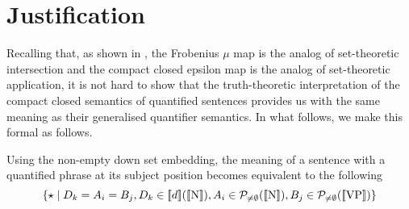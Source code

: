 \section{Justification}
\label{just}



Recalling that, as shown in \cite{CoeckePaquettePavlovic09,CoeckePaq},  the Frobenius $ \mu$ map is the analog of  set-theoretic intersection and the compact closed  epsilon map is the analog of  set-theoretic application, it is not hard to show that  the truth-theoretic interpretation of the compact closed semantics of quantified sentences provides us with the same meaning as their generalised quantifier semantics. In what follows,  we make this formal as follows. 


\begin{lemma}
Using the non-empty down set embedding, the meaning of a sentence with a quantified phrase at its subject position becomes equivalent to the following
\[
 \{\star \mid  D_k = A_i = B_j , D_k \in \semantics{d}(\semantics{\text{N}}),  A_i \in {\cal P}_{\neq \emptyset} (\semantics{\text{N}}), B_j \in  {\cal P}_{\neq \emptyset} (\semantics{\text{VP}})\}
 \]
\end{lemma}

